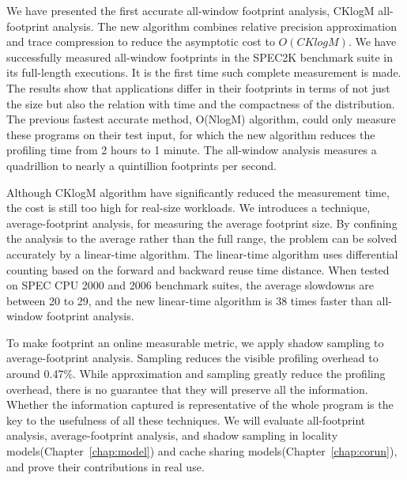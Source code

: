 We have presented the first accurate all-window footprint analysis,
CKlogM all-footprint analysis.
The new algorithm combines relative precision
approximation and trace compression to reduce the asymptotic cost to
$O(CKlogM)$.  We have successfully measured all-window footprints in
the SPEC2K benchmark suite in its full-length executions.  It is the
first time such complete measurement is made.  The results show that
applications differ in their footprints in terms of not just the size
but also the relation with time and the compactness of the
distribution.  The previous fastest accurate method, O(NlogM)
algorithm, could only measure these programs on their test input, for
which the new algorithm reduces the profiling time from 2 hours to 1
minute.  The all-window analysis measures a quadrillion to nearly a
quintillion footprints per second.

Although CKlogM algorithm have significantly reduced the measurement
time, the cost is still too high for real-size workloads. We
introduces a technique, average-footprint analysis, for measuring the
average footprint size. By confining the analysis to the average
rather than the full range, the 
problem  can be solved accurately by a linear-time algorithm.
The linear-time algorithm uses differential counting based on the
forward and backward reuse time distance.  When tested on SPEC CPU
2000 and 2006 benchmark suites, the average slowdowns are between 20
to 29, and the new linear-time algorithm is 38 times faster than
all-window footprint analysis. 

To make footprint an online measurable metric, we apply shadow
sampling to average-footprint analysis. Sampling reduces the visible
profiling overhead to around 0.47\%. While approximation and sampling
greatly reduce the profiling overhead, there is no guarantee that they
will preserve all the information. Whether the information captured is
representative of the whole program is the key to the usefulness of
all these techniques. We will evaluate all-footprint analysis,
average-footprint analysis, and shadow sampling in locality
models(Chapter~\ref{chap:model}) and cache sharing
models(Chapter~\ref{chap:corun}), and prove their contributions in real
use. 



